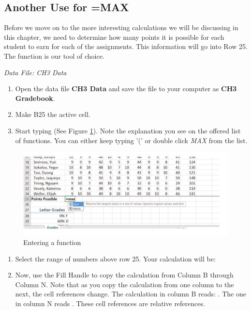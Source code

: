 \subsection{Another Use for =MAX}

Before we move on to the more interesting calculations we will be discussing in this chapter, we need to determine how many points it is possible for each student to earn for each of the assignments. This information will go into Row 25. The  function is our tool of choice.

\textit{Data File: CH3 Data}

\begin{enumerate}
	\item Open the data file \textbf{CH3 Data} and save the file to your computer as \textbf{CH3 Gradebook}.
	\item Make \textsf{B25} the active cell.
	\item Start typing  (See Figure \ref{03:fig02}). Note the explanation you see on the offered list of functions. You can either keep typing '(' or double click \textit{MAX} from the list.
\end{enumerate}

\begin{figure}[H]
	\centering
	\includegraphics[width=\maxwidth{.95\linewidth}]{gfx/ch03_fig02}
	\caption{Entering a function}
	\label{03:fig02}
\end{figure}

\begin{enumerate}[resume]
	\item Select the range of numbers above row 25. Your calculation will be: 
	\item Now, use the Fill Handle to copy the calculation from Column B through Column N. Note that as you copy the calculation from one column to the next, the cell references change. The calculation in column B reads: . The one in column N reads . These cell references are relative references.
\end{enumerate}

